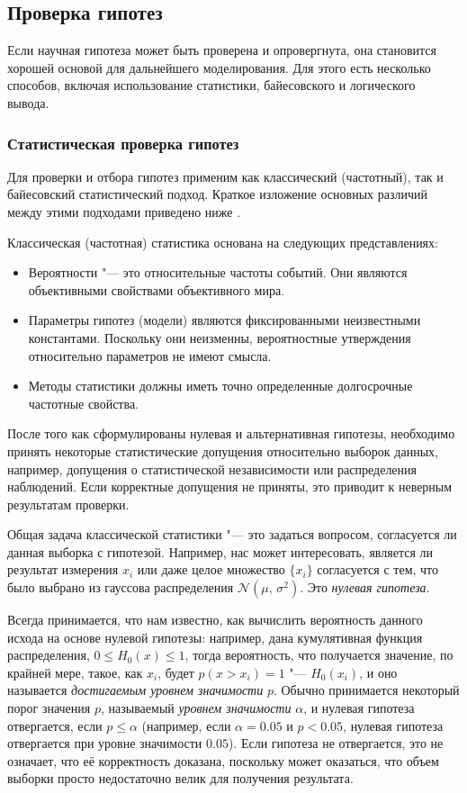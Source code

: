 \subsection{Проверка гипотез}\label{sect1_2_2}
Если научная гипотеза может быть проверена и опровергнута, она становится хорошей основой для дальнейшего 
моделирования. Для этого есть несколько способов, включая использование статистики, байесовского и логического вывода.
\subsubsection{Статистическая проверка гипотез}\label{sect1_2_2_1}
Для проверки и отбора гипотез применим как классический (частотный), так и байесовский статистический подход. 
Краткое изложение основных различий между этими подходами приведено ниже \cite{ivezic2019statistics}.

Классическая (частотная) статистика основана на следующих представлениях:
\begin{itemize}
    \item Вероятности "--- это относительные частоты событий. Они являются объективными свойствами объективного мира.
    \item Параметры гипотез (модели) являются фиксированными неизвестными константами. Поскольку они неизменны, 
            вероятностные утверждения относительно параметров не имеют смысла.
    \item Методы статистики должны иметь точно определенные долгосрочные частотные свойства.
\end{itemize}

После того как сформулированы нулевая и альтернативная гипотезы, необходимо принять некоторые статистические допущения 
относительно выборок данных, например, допущения о статистической независимости или распределения наблюдений. Если 
корректные допущения не приняты, это приводит к неверным результатам проверки.

Общая задача классической статистики "--- это задаться вопросом, согласуется ли данная выборка с гипотезой. Например, 
нас может интересовать, является ли результат измерения $x_i$ или даже целое множество $\{x_i\}$ согласуется с тем, 
что было выбрано из гауссова распределения $\mathcal{N}(\mu,\,\sigma^{2})$. Это \textit{нулевая гипотеза}.

Всегда принимается, что нам известно, как вычислить вероятность данного исхода на основе нулевой гипотезы: например, 
дана кумулятивная функция распределения, $0 \leq H_0(x) \leq 1$, тогда вероятность, что получается значение, 
по крайней мере, такое, как $x_i$, будет $p(x > x_i) = 1 $ "--- $H_0(x_i)$, и оно называется 
\textit{достигаемым уровнем значимости} $p$. Обычно принимается некоторый порог значения $p$, 
называемый \textit{уровнем значимости} $\alpha$, и нулевая гипотеза отвергается, если $p \leq \alpha $ 
(например, если $\alpha = 0.05$ и $p < 0.05$, нулевая гипотеза отвергается при уровне значимости $0.05$). 
Если гипотеза не отвергается, это не означает, что её корректность доказана, поскольку может оказаться, что объем 
выборки просто недостаточно велик для получения результата.

